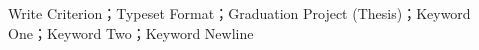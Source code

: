\documentclass[../../main.tex]{subfiles}
\begin{document}
\begin{enabstract}{Write Criterion；Typeset Format；Graduation Project (Thesis)；Keyword One；Keyword Two；Keyword Newline}
\lipsum[10]
\end{enabstract}
\end{document}
